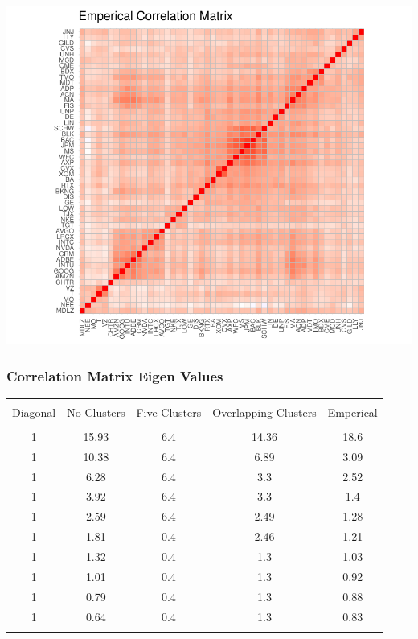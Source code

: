 \documentclass[11pt,preprint, authoryear]{elsarticle}
\let\origfigure\figure
\let\endorigfigure\endfigure
\renewenvironment{figure}[1][2] {
    \expandafter\origfigure\expandafter[H]
} {
    \endorigfigure
}
\let\origtable\table
\let\endorigtable\endtable
\renewenvironment{table}[1][2] {
    \expandafter\origtable\expandafter[H]
} {
    \endorigtable
}
\numberwithin{equation}{section}
\numberwithin{figure}{section}
\numberwithin{table}{section}
\begin{document}
\begin{figure}
\centering
\includegraphics{Thesis_files/figure-latex/unnamed-chunk-1-1.pdf}
\caption{\label{corr_emp} Emperical Correlation Matrix}
\end{figure}

\hypertarget{correlation-matrix-eigen-values}{%
\subsubsection{Correlation Matrix Eigen
Values}\label{correlation-matrix-eigen-values}}

\begin{table}[!htbp] \centering 
  \caption{} 
  \label{eigens} 
\begin{tabular}{@{\extracolsep{5pt}} ccccc} 
\\[-1.8ex]\hline 
\hline \\[-1.8ex] 
Diagonal & No Clusters & Five Clusters & Overlapping Clusters & Emperical \\ 
\hline \\[-1.8ex] 
1 & 15.93 & 6.4 & 14.36 & 18.6 \\ 
1 & 10.38 & 6.4 & 6.89 & 3.09 \\ 
1 & 6.28 & 6.4 & 3.3 & 2.52 \\ 
1 & 3.92 & 6.4 & 3.3 & 1.4 \\ 
1 & 2.59 & 6.4 & 2.49 & 1.28 \\ 
1 & 1.81 & 0.4 & 2.46 & 1.21 \\ 
1 & 1.32 & 0.4 & 1.3 & 1.03 \\ 
1 & 1.01 & 0.4 & 1.3 & 0.92 \\ 
1 & 0.79 & 0.4 & 1.3 & 0.88 \\ 
1 & 0.64 & 0.4 & 1.3 & 0.83 \\ 
\hline \\[-1.8ex] 
\end{tabular} 
\end{table}
\end{document}
